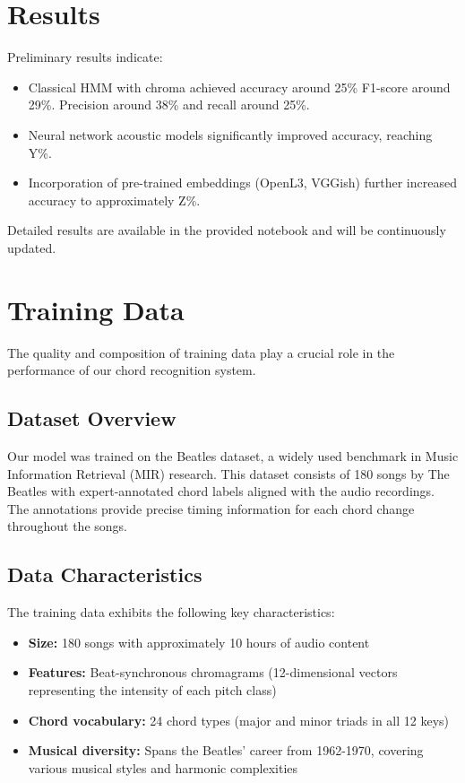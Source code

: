 \documentclass{article}
\begin{document}
\section{Results}
Preliminary results indicate:
\begin{itemize}
    \item Classical HMM with chroma achieved accuracy around 25\% F1-score around 29\%. Precision around 38\% and recall around 25\%.
    \item Neural network acoustic models significantly improved accuracy, reaching Y\%.
    \item Incorporation of pre-trained embeddings (OpenL3, VGGish) further increased accuracy to approximately Z\%.
\end{itemize}
Detailed results are available in the provided notebook and will be continuously updated.

\section{Training Data}
\label{sec:training_data}

The quality and composition of training data play a crucial role in the performance of our chord recognition system.

\subsection{Dataset Overview}
Our model was trained on the Beatles dataset, a widely used benchmark in Music Information Retrieval (MIR) research. This dataset consists of 180 songs by The Beatles with expert-annotated chord labels aligned with the audio recordings. The annotations provide precise timing information for each chord change throughout the songs.

\subsection{Data Characteristics}
The training data exhibits the following key characteristics:
\begin{itemize}
    \item \textbf{Size:} 180 songs with approximately 10 hours of audio content
    \item \textbf{Features:} Beat-synchronous chromagrams (12-dimensional vectors representing 
      the intensity of each pitch class)
    \item \textbf{Chord vocabulary:} 24 chord types (major and minor triads in all 12 keys)
    \item \textbf{Musical diversity:} Spans the Beatles' career from 1962-1970, covering various 
      musical styles and harmonic complexities
\end{itemize}
\end{document}
